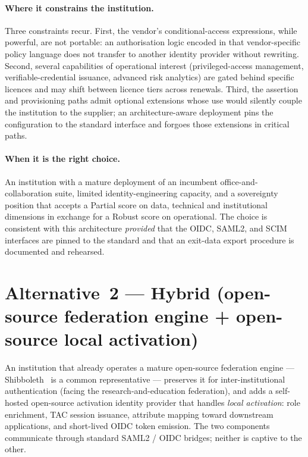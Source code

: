 \paragraph{Where it constrains the institution.} Three constraints
recur. First, the vendor's conditional-access expressions, while
powerful, are
not portable: an authorisation logic encoded in that vendor-specific
policy language
does not transfer to another identity provider without rewriting.
Second, several capabilities of operational interest (privileged-access
management, verifiable-credential issuance, advanced risk analytics) are
gated behind specific licences and may shift between licence tiers
across renewals. Third, the assertion and provisioning paths admit
optional extensions whose use would silently couple the institution
to the supplier; an architecture-aware deployment pins the
configuration to the standard interface and forgoes those extensions
in critical paths.

\paragraph{When it is the right choice.} An institution with a
mature deployment of an incumbent office-and-collaboration suite,
limited identity-engineering capacity,
and a sovereignty position that accepts a Partial score on data,
technical and institutional dimensions in exchange for a Robust score
on operational. The choice is consistent with this architecture
\emph{provided} that the OIDC, SAML2, and SCIM interfaces are pinned
to the standard and that an exit-data export procedure is documented
and rehearsed.

\section{Alternative~2 --- Hybrid (open-source federation engine + open-source local activation)}
\label{sec:id-alt2}

\begin{alternativebox}
\noindent An institution that already operates a mature open-source
federation engine --- Shibboleth~\cite{shibboleth} is a common
representative --- preserves it for
inter-institutional authentication (facing the research-and-education
federation), and adds a
self-hosted open-source activation identity provider that
handles \emph{local activation}: role enrichment, TAC session
issuance, attribute mapping toward downstream applications, and
short-lived OIDC token emission. The two components communicate
through standard SAML2 / OIDC bridges; neither is captive to the
other.
\end{alternativebox}

